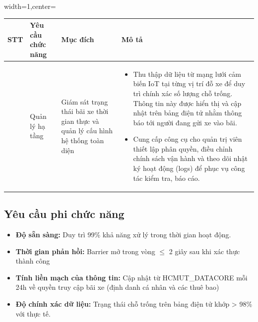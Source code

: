 \newpage
\begin{adjustbox}{width=1\textwidth,center=\textwidth}
    \small
    \begin{tabular}{|>{\centering\arraybackslash}m{1cm}|>{\centering\arraybackslash}m{3cm}|>{\centering\arraybackslash}m{4.7cm}|>{\centering\arraybackslash}m{7cm}|}
    \hline
    \textbf{STT} & \textbf{Yêu cầu chức năng} & \textbf{Mục đích} & \textbf{Mô tả}\\
    \hline
    3 & Quản lý hạ tầng & Giám sát trạng thái bãi xe thời gian thực và quản lý cấu hình hệ thống toàn diện & \begin{itemize}[leftmargin=0pt, label={}]
        \item Thu thập dữ liệu từ mạng lưới cảm biến IoT tại từng vị trí đỗ xe để duy trì chính xác số lượng chỗ trống. Thông tin này được hiển thị và cập nhật trên bảng điện tử nhằm thông báo tới người đang gửi xe vào bãi.
        \item Cung cấp công cụ cho quản trị viên thiết lập phân quyền, điều chỉnh chính sách vận hành và theo dõi nhật ký hoạt động (logs) để phục vụ công tác kiểm tra, báo cáo.
    \end{itemize} \\
    \hline
    \end{tabular}
\end{adjustbox}
\subsection{Yêu cầu phi chức năng}
\begin{itemize}[label=-]
    \item \textbf{Độ sẵn sàng:} Duy trì 99\% khả năng xử lý trong thời gian hoạt động.
    \vspace{-10pt}
    \item \textbf{Thời gian phản hồi:} Barrier mở trong vòng $\le$ 2 giây sau khi xác thực thành công
    \vspace{-10pt}
    \item \textbf{Tính liền mạch của thông tin:} Cập nhật từ HCMUT\_DATACORE mỗi 24h về quyền truy cập bãi xe (định danh cá nhân và các thuê bao)
    \vspace{-10pt}
    \item \textbf{Độ chính xác dữ liệu:} Trạng thái chỗ trống trên bảng điện tử khớp > 98\% với thực tế.
\end{itemize}